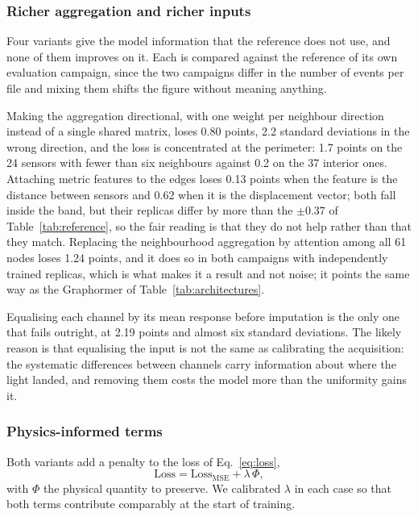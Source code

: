 \documentclass[10pt,conference]{IEEEtran}
\begin{document}
\subsubsection{Richer aggregation and richer inputs}
Four variants give the model information that the reference does not use, and
none of them improves on it. Each is compared against the reference of its own
evaluation campaign, since the two campaigns differ in the number of events per
file and mixing them shifts the figure without meaning anything.

Making the aggregation directional, with one weight per neighbour direction
instead of a single shared matrix, loses 0.80 points, 2.2 standard deviations in
the wrong direction, and the loss is concentrated at the perimeter: 1.7 points
on the 24 sensors with fewer than six neighbours against 0.2 on the 37 interior
ones. Attaching metric features to the edges loses 0.13 points
when the feature is the distance between sensors and 0.62 when it is the
displacement vector; both fall inside the band, but their replicas differ by
more than the $\pm 0.37$ of Table~\ref{tab:reference}, so the fair reading is
that they do not help rather than that they match. Replacing the neighbourhood
aggregation by attention among all 61 nodes loses 1.24 points, and it does so in
both campaigns with independently trained replicas, which is what makes it a
result and not noise; it points the same way as the Graphormer of
Table~\ref{tab:architectures}.

Equalising each channel by its mean response before imputation is the only one
that fails outright, at 2.19 points and almost six standard deviations. The
likely reason is that equalising the input is not the same as calibrating the
acquisition: the systematic differences between channels carry information about
where the light landed, and removing them costs the model more than the
uniformity gains it.

\subsubsection{Physics-informed terms}
Both variants add a penalty to the loss of Eq.~\ref{eq:loss},
%
\begin{equation}
\mathrm{Loss} = \mathrm{Loss}_{\mathrm{MSE}} + \lambda \, \Phi,
\label{eq:physloss}
\end{equation}
%
with $\Phi$ the physical quantity to preserve. We calibrated $\lambda$ in each
case so that both terms contribute comparably at the start of training.
\end{document}
